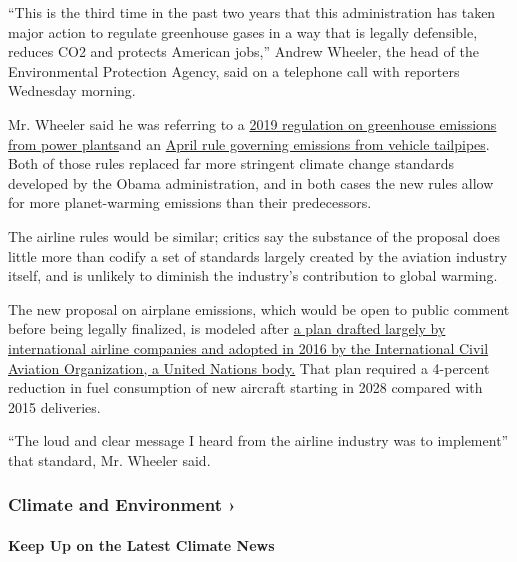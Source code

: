 ``This is the third time in the past two years that this administration
has taken major action to regulate greenhouse gases in a way that is
legally defensible, reduces CO2 and protects American jobs,'' Andrew
Wheeler, the head of the Environmental Protection Agency, said on a
telephone call with reporters Wednesday morning.

Mr. Wheeler said he was referring to a
\href{https://www.nytimes3xbfgragh.onion/2019/06/19/climate/epa-coal-emissions.html}{2019
regulation on greenhouse emissions from power plants}and an
\href{https://www.nytimes3xbfgragh.onion/2020/03/30/climate/trump-fuel-economy.html}{April
rule governing emissions from vehicle tailpipes}. Both of those rules
replaced far more stringent climate change standards developed by the
Obama administration, and in both cases the new rules allow for more
planet-warming emissions than their predecessors.

The airline rules would be similar; critics say the substance of the
proposal does little more than codify a set of standards largely created
by the aviation industry itself, and is unlikely to diminish the
industry's contribution to global warming.

The new proposal on airplane emissions, which would be open to public
comment before being legally finalized, is modeled after
\href{https://www.nytimes3xbfgragh.onion/2016/02/09/business/energy-environment/un-agency-proposes-limits-on-airlines-carbon-emissions.html}{a
plan drafted largely by international airline companies and adopted in
2016 by the International Civil Aviation Organization, a United Nations
body.} That plan required a 4-percent reduction in fuel consumption of
new aircraft starting in 2028 compared with 2015 deliveries.

``The loud and clear message I heard from the airline industry was to
implement'' that standard, Mr. Wheeler said.

\href{https://www.nytimes3xbfgragh.onion/section/climate?action=click\&pgtype=Article\&state=default\&region=MAIN_CONTENT_1\&context=storylines_keepup}{}

\hypertarget{climate-and-environment-}{%
\subsubsection{Climate and Environment
›}\label{climate-and-environment-}}

\hypertarget{keep-up-on-the-latest-climate-news}{%
\paragraph{Keep Up on the Latest Climate
News}\label{keep-up-on-the-latest-climate-news}}

